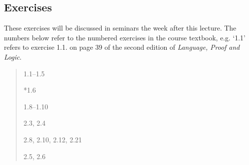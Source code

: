 \documentclass[12pt]{extarticle}
\begin{document}
\begin{multicols*}{3}
\begin{minipage}{\columnwidth}
\section{Exercises}
These exercises will be discussed in seminars the week after this lecture.
The numbers below refer to the numbered exercises in the course textbook, e.g. `1.1' refers to exercise 1.1. on page 39 of the second edition of \emph{Language, Proof and Logic}.
 
\begin{quote}
1.1--1.5
 
*1.6
 
1.8--1.10
 
2.3, 2.4
 
2.8, 2.10, 2.12, 2.21
 
2.5, 2.6
 
\end{quote}
\end{minipage}

 

\end{multicols*}
\end{document}
